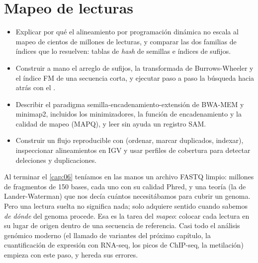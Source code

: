 \chapter{Mapeo de lecturas}\label{cap:07}

\newcommand{\capsieteT}{\texttt{TACATACAG\$}}
\newcommand{\capsieteOcc}{\operatorname{Occ}}
\newcommand{\capsieteLF}{\operatorname{LF}}
\newcommand{\capsieteSA}{\operatorname{SA}}
\newcommand{\capsieteMQ}{\operatorname{MAPQ}}


\begin{objetivos}
\begin{itemize}
  \item Explicar por qué el alineamiento por programación dinámica no escala al mapeo de cientos de millones de lecturas, y comparar las dos familias de índices que lo resuelven: tablas de \emph{hash} de semillas e índices de sufijos.
  \item Construir a mano el arreglo de sufijos, la transformada de Burrows-Wheeler y el índice FM de una secuencia corta, y ejecutar paso a paso la búsqueda hacia atrás con el .
  \item Describir el paradigma semilla-encadenamiento-extensión de BWA-MEM y minimap2, incluidos los minimizadores, la función de encadenamiento y la calidad de mapeo (MAPQ), y leer sin ayuda un registro SAM.
  \item Construir un flujo reproducible con  (ordenar, marcar duplicados, indexar), inspeccionar alineamientos en IGV y usar perfiles de cobertura para detectar deleciones y duplicaciones.
\end{itemize}
\end{objetivos}

Al terminar el \cref{cap:06} teníamos en las manos un archivo FASTQ limpio: millones de fragmentos de 150 bases, cada uno con su calidad Phred, y una teoría (la de Lander-Waterman) que nos decía cuántos necesitábamos para cubrir un genoma. Pero una lectura suelta no significa nada; solo adquiere sentido cuando sabemos \emph{de dónde} del genoma procede. Esa es la tarea del \emph{mapeo}: colocar cada lectura en su lugar de origen dentro de una secuencia de referencia. Casi todo el análisis genómico moderno (el llamado de variantes del próximo capítulo, la cuantificación de expresión con RNA-seq, los picos de ChIP-seq, la metilación) empieza con este paso, y hereda sus errores.

